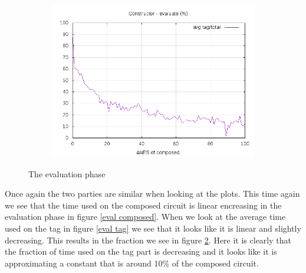 \documentclass[10pt,a4paper]{article}
\begin{document}
\begin{figure}[h]
\begin{subfigure}[t]{0.3\textwidth}
        \includegraphics[width=\textwidth]{const_eval_frac}
        \caption{}
        \label{eval frac}
    \end{subfigure}
    \caption{The evaluation phase}
\end{figure}

Once again the two parties are similar when looking at the plots. This time again we see that the time used on the composed circuit is linear encreasing in the evaluation phase in figure \ref{eval composed}. When we look at the average time used on the tag in figure \ref{eval tag} we see that it looks like it is linear and slightly decreasing. This results in the fraction we see in figure \ref{eval frac}. Here it is clearly that the fraction of time used on the tag part is decreasing and it looks like it is approximating a constant that is around 10\% of the composed circuit.
\end{document}
